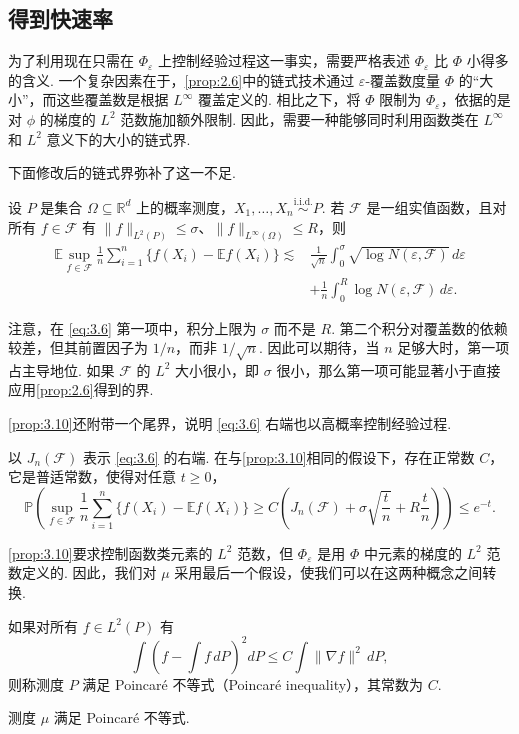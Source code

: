 \subsection{得到快速率}\label{sec:3.6}
为了利用现在只需在 $\Phi_\varepsilon$ 上控制经验过程这一事实，需要严格表述 $\Phi_\varepsilon$ 比 $\Phi$ 小得多的含义. 一个复杂因素在于，\autoref{prop:2.6}中的链式技术通过 $\varepsilon$-覆盖数度量 $\Phi$ 的“大小”，而这些覆盖数是根据 $L^\infty$ 覆盖定义的. 相比之下，将 $\Phi$ 限制为 $\Phi_\varepsilon$，依据的是对 $\phi$ 的梯度的 $L^2$ 范数施加额外限制. 因此，需要一种能够同时利用函数类在 $L^\infty$ 和 $L^2$ 意义下的大小的链式界.

下面修改后的链式界弥补了这一不足.
\begin{proposition}\label{prop:3.10}
设 $P$ 是集合 $\Omega\subseteq\mathbb R^d$ 上的概率测度，$X_1,\ldots,X_n\overset{\mathrm{i.i.d.}}\sim P$. 若 $\mathcal F$ 是一组实值函数，且对所有 $f\in\mathcal F$ 有 $\|f\|_{L^2(P)}\le\sigma$、$\|f\|_{L^\infty(\Omega)}\le R$，则
\begin{equation}\label{eq:3.6}
\begin{aligned}
\mathbb E\sup_{f\in\mathcal F}\frac1n\sum_{i=1}^n\{f(X_i)-\mathbb Ef(X_i)\}
\lesssim{}&\frac1{\sqrt n}\int_0^\sigma\sqrt{\log N(\varepsilon,\mathcal F)}\,d\varepsilon\\
&+\frac1n\int_0^R\log N(\varepsilon,\mathcal F)\,d\varepsilon.
\end{aligned}
\end{equation}
\end{proposition}
注意，在 \eqref{eq:3.6} 第一项中，积分上限为 $\sigma$ 而不是 $R$. 第二个积分对覆盖数的依赖较差，但其前置因子为 $1/n$，而非 $1/\sqrt n$. 因此可以期待，当 $n$ 足够大时，第一项占主导地位. 如果 $\mathcal F$ 的 $L^2$ 大小很小，即 $\sigma$ 很小，那么第一项可能显著小于直接应用\autoref{prop:2.6}得到的界.

\autoref{prop:3.10}还附带一个尾界，说明 \eqref{eq:3.6} 右端也以高概率控制经验过程.
\begin{proposition}\label{prop:3.11}
以 $J_n(\mathcal F)$ 表示 \eqref{eq:3.6} 的右端. 在与\autoref{prop:3.10}相同的假设下，存在正常数 $C$，它是普适常数，使得对任意 $t\ge0$，
$$\mathbb P\left(\sup_{f\in\mathcal F}\frac1n\sum_{i=1}^n\{f(X_i)-\mathbb Ef(X_i)\}
\ge C\left(J_n(\mathcal F)+\sigma\sqrt{\frac tn}+R\frac tn\right)\right)\le e^{-t}.$$
\end{proposition}

\autoref{prop:3.10}要求控制函数类元素的 $L^2$ 范数，但 $\Phi_\varepsilon$ 是用 $\Phi$ 中元素的梯度的 $L^2$ 范数定义的. 因此，我们对 $\mu$ 采用最后一个假设，使我们可以在这两种概念之间转换.
\begin{definition}\label{def:3.12}
如果对所有 $f\in L^2(P)$ 有
$$\int\left(f-\int f\,dP\right)^2dP\le C\int\|\nabla f\|^2\,dP,$$
则称测度 $P$ 满足 Poincar\'e 不等式（Poincar\'e inequality），其常数为 $C$.
\end{definition}
\begin{assumption}\label{assump:3.13}
测度 $\mu$ 满足 Poincar\'e 不等式.
\end{assumption}

